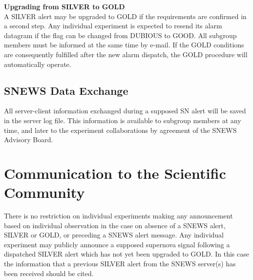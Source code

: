 \documentclass{article}
\begin{document}
\noindent \textbf{Upgrading from SILVER to GOLD}\\
A SILVER alert may be upgraded to GOLD if the requirements are
confirmed in a second step. Any individual experiment is expected to
resend its alarm datagram if the flag can be changed from DUBIOUS to
GOOD. All subgroup members must be informed at the same time by
e-mail. If the GOLD conditions are consequently fulfilled after the
new alarm dispatch, the GOLD procedure will automatically operate.

\subsection{SNEWS Data Exchange}

All server-client information
exchanged during a supposed SN alert will be saved
in the server log file. This information is available to subgroup
members at any time, and later to the experiment collaborations
by agreement of the SNEWS Advisory Board.



\section{Communication to the Scientific Community}
There is no restriction on individual experiments making any announcement
based on individual observation in the case on absence of a SNEWS
alert, SILVER or GOLD, or preceding a SNEWS alert message.  
Any individual experiment may
publicly announce a supposed supernova signal following a dispatched 
SILVER alert which has not yet been upgraded to GOLD.  In this case 
the information that a previous SILVER alert from the
SNEWS server(s) has been received should be cited.
                                         
\end{document}
